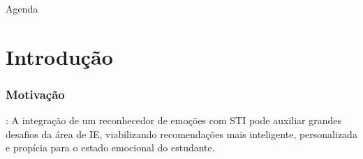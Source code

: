 \documentclass{beamer}
\date{Manaus, 30 de Julho de 2018}
\begin{document}
\begin{frame}
 \maketitle
\end{frame}

\begin{frame}{Agenda}
  \tableofcontents
\end{frame}

\section{Introdu\c{c}\~ao}


\begin{frame}
\frametitle{Motiva\c{c}\~ao}
\pause

\cite{jaques2012}: A integra\c{c}\~ao de um reconhecedor de emo\c{c}\~oes com STI pode auxiliar grandes desafios da \'area de IE, 
viabilizando recomenda\c{c}\~oes mais inteligente, personalizada e prop\'icia para o estado emocional do estudante.

\end{frame}
\end{document}
